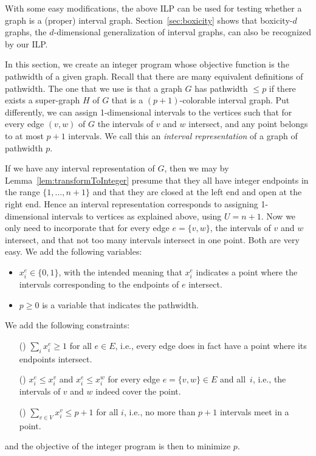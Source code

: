 \documentclass[runningheads]{llncs}
\newcounter{constr}
\newcommand{\constr}[1]{\noindent \refstepcounter{constr}\theconstr #1}
\begin{document}
\par
With some easy modifications, the above ILP can be used 
for testing whether a graph is a (proper) interval graph. Section~\ref{sec:boxicity} shows that boxicity-$d$ graphs, the $d$-dimensional generalization of interval graphs, can also be recognized by our ILP.


\iffalse

In this section, we create an integer program whose objective
function is the pathwidth of a given graph.
Recall that there are many equivalent definitions of pathwidth.
The one that we use is that a graph $G$ has pathwidth $\leq p$ 
if there exists a super-graph $H$ of $G$ that is a $(p+1)$-colorable
interval graph.  Put differently, we can assign 1-dimensional
intervals to the vertices such that for every edge $(v,w)$ of $G$
the intervals of $v$ and $w$ intersect, and any point belongs to at
most $p+1$ intervals.  We call this an {\em interval representation}
of a graph of pathwidth $p$.

If we have any interval representation of $G$, then we may by
Lemma~\ref{lem:transformToInteger} presume
that they all have integer endpoints in the range $\{1,\dots,n+1\}$
and that they are closed at the left end and open at the right end.
Hence an interval representation corresponds to assigning
1-dimensional intervals to vertices as explained above, using $U=n+1$.  
Now we only
need to incorporate that for every edge $e=\{v,w\}$, the intervals
of $v$ and $w$ intersect, and that not too many intervals intersect
in one point.    Both are very easy.  We add the following variables:

\begin{itemize}
\item $x_i^e \in \{0,1\}$, with the intended meaning that $x_i^e$
	indicates a point where the 
	intervals corresponding to the endpoints of $e$ intersect.
\item $p\geq 0$ is a variable that indicates the pathwidth.
\end{itemize}

We add the following constraints:
\begin{itemize}
\item[(\constr{\label{c:1dim:pw:1}})]
  $\sum_i x_i^e \geq  1$ for all $e\in E$, 
	i.e., every edge does in fact have
	a point where its endpoints intersect.
\item[(\constr{\label{c:1dim:pw:2}})] 
	$x_i^e \leq x_i^v$ and $x_i^e\leq x_i^w$ for every edge
	$e=\{ v,w \}\in E$ and all~$i$, i.e., the intervals of $v$ and $w$ indeed
	cover the point.
\item[(\constr{\label{c:1dim:pw:3}})]
 $\sum_{v\in V} x_i^v \leq p+1$ for all $i$, i.e., no more than $p+1$ intervals meet in a point.
\end{itemize}
and the objective of the integer program is then to minimize $p$.
\end{document}
